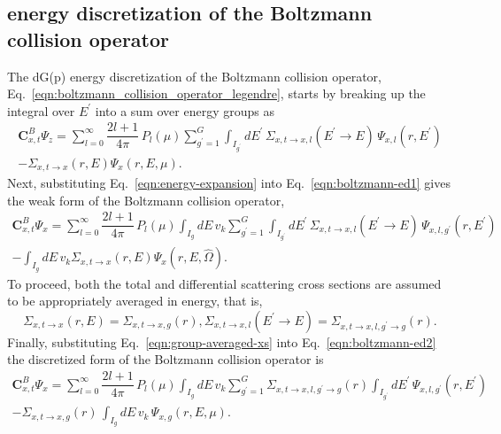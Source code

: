 \documentclass[../main.tex]{subfiles}
\begin{document}
\subsection{\dG energy discretization of the Boltzmann collision operator}
The dG(p) energy discretization of the Boltzmann collision operator, Eq.~\eqref{eqn:boltzmann_collision_operator_legendre}, starts by breaking up the integral over $E^{\prime}$ into a sum over energy groups as
\begin{multline} \label{eqn:boltzmann-ed1}
    \boldsymbol{C}_{x,t}^B \Psi_z = \sum_{l=0}^{\infty} \dfrac{2l+1}{4 \pi} \, P_l(\mu)  \sum_{g^{\prime}=1}^G \int_{I_{g^{\prime}}} 
    dE^{\prime} \, \Sigma_{x,t\rightarrow x, l}(E^{\prime} \rightarrow E) \, \Psi_{x,l}(r,E^{\prime}) \\
    - \Sigma_{x,t \rightarrow x}(r,E) \Psi_x(r,E,\mu).
\end{multline}
Next, substituting Eq.~\eqref{eqn:energy-expansion} into Eq.~\eqref{eqn:boltzmann-ed1} gives the weak form of the Boltzmann collision operator,
\begin{multline} \label{eqn:boltzmann-ed2}
    \boldsymbol{C}_{x,t}^B \Psi_x = \sum_{l=0}^{\infty} \dfrac{2l+1}{4 \pi} \, P_l(\mu) \int_{I_g} dE \, v_k  \sum_{g^{\prime}=1}^G \int_{I_{g^{\prime}}} 
    dE^{\prime} \, \Sigma_{x,t\rightarrow x, l}(E^{\prime} \rightarrow E) \, \Psi_{x,l,g^{\prime}}(r,E^{\prime}) \\
    - \int_{I_g} dE \, v_k \Sigma_{x,t\rightarrow x}(r,E) \Psi_x(r,E,\hat{\Omega}).
\end{multline}
To proceed, both the total and differential scattering cross sections are assumed to be appropriately averaged in energy, that is,
\begin{subequations} \label{eqn:group-averaged-xs}
    \begin{equation} 
        \Sigma_{x,t \rightarrow x}(r,E) = \Sigma_{x,t \rightarrow x, g}(r),
    \end{equation}
    \begin{equation}
        \Sigma_{x,t \rightarrow x,l}(E^{\prime} \rightarrow E) = \Sigma_{x,t\rightarrow x,l,g^{\prime}\rightarrow g}(r).
    \end{equation}
\end{subequations}
Finally, substituting Eq.~\eqref{eqn:group-averaged-xs} into Eq.~\eqref{eqn:boltzmann-ed2} the \dG discretized form of the Boltzmann collision operator is
\begin{multline} \label{eqn:boltzmann-ed3}
    \boldsymbol{C}_{x,t}^B \Psi_x = \sum_{l=0}^{\infty} \dfrac{2l+1}{4 \pi} \, P_l(\mu) \int_{I_g} dE \, v_k  \sum_{g^{\prime}=1}^G \Sigma_{x,t\rightarrow x,l,g^{\prime}\rightarrow g}(r) \int_{I_{g^{\prime}}} 
    dE^{\prime} \, \Psi_{x,l,g^{\prime}}(r,E^{\prime}) \\
    - \Sigma_{x,t\rightarrow x,g}(r) \, \int_{I_g} dE \, v_k \, \Psi_{x,g}(r,E,\mu).
\end{multline}
\end{document}
